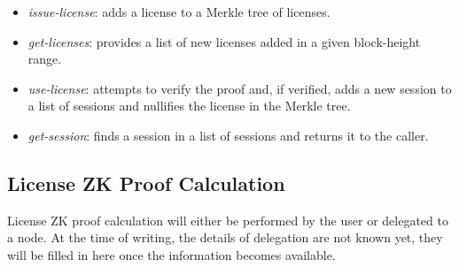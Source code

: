 \begin{itemize}%
	\item \textit{issue-license}: adds a license to a Merkle tree of licenses.
	\item \textit{get-licenses}: provides a list of new licenses added in a given block-height range.
	\item \textit{use-license}: attempts to verify the proof and, if verified, adds a new session to a list of sessions and nullifies the license in the Merkle tree.
	\item \textit{get-session}: finds a session in a list of sessions and returns it to the caller.
\end{itemize}


\subsection{License ZK Proof Calculation}

License ZK proof calculation will either be performed by the user or delegated to a node. At the time of writing, the details of delegation are not known yet, they will be filled in here once the information becomes available.
